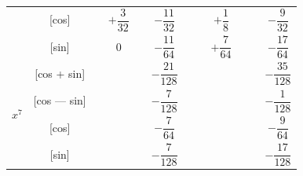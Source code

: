 \documentclass[11pt,a4paper]{book}
\begin{document}
{{\begin{center}
\begin{tabular}{|c|c|c|c|c|c|c|c|c|c|c|c|}
& [cos] & & $+\dfrac{3}{32}$ & & $-\dfrac{11}{32}$ & & & $+\dfrac{1}{8}$ & & & $-\dfrac{9}{32}$ \\
& [sin] & & $0$ & & $-\dfrac{11}{64}$ & & & $+\dfrac{7}{64}$ & & & $-\dfrac{17}{64}$ \\
\hline
\multirow{4}{*}{$x^7$} & [cos + sin] & & & & $-\dfrac{21}{128}$ & & & & & & $-\dfrac{35}{128}$ \\
& [cos --- sin] & & & & $-\dfrac{7}{128}$ & & & & & & $-\dfrac{1}{128}$ \\
& [cos] & & & & $-\dfrac{7}{64}$ & & & & & & $-\dfrac{9}{64}$ \\
& [sin] & & & & $-\dfrac{7}{128}$ & & & & & & $-\dfrac{17}{128}$ \\
\hline
\end{tabular}
\end{center}

\vspace{1em}


}}
\end{document}
